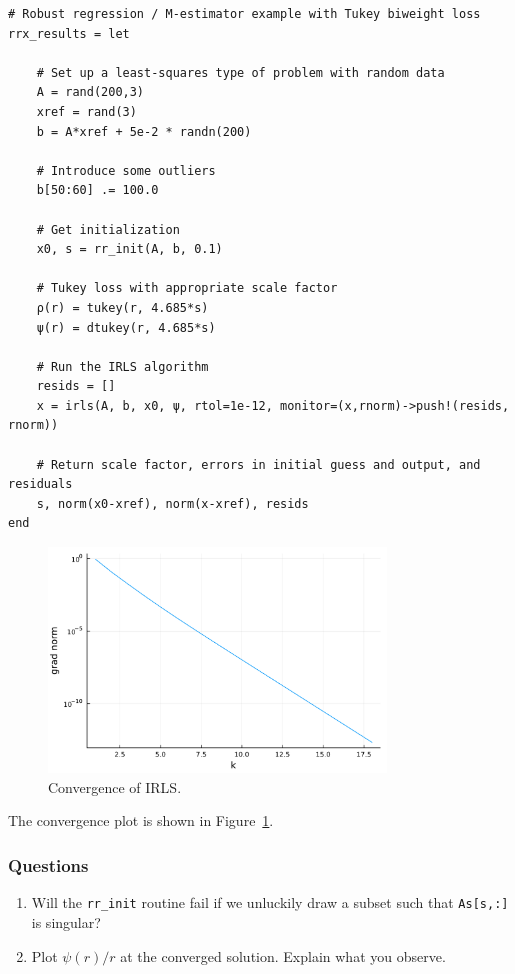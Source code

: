\documentclass[12pt, leqno]{article} %
\providecommand{\tightlist}{%
  \setlength{\itemsep}{0pt}\setlength{\parskip}{0pt}}
\begin{document}
\begin{verbatim}
# Robust regression / M-estimator example with Tukey biweight loss
rrx_results = let

    # Set up a least-squares type of problem with random data
    A = rand(200,3)
    xref = rand(3)
    b = A*xref + 5e-2 * randn(200)
    
    # Introduce some outliers
    b[50:60] .= 100.0
    
    # Get initialization
    x0, s = rr_init(A, b, 0.1)
    
    # Tukey loss with appropriate scale factor
    ρ(r) = tukey(r, 4.685*s)
    ψ(r) = dtukey(r, 4.685*s)
    
    # Run the IRLS algorithm
    resids = []
    x = irls(A, b, x0, ψ, rtol=1e-12, monitor=(x,rnorm)->push!(resids, rnorm))
    
    # Return scale factor, errors in initial guess and output, and residuals
    s, norm(x0-xref), norm(x-xref), resids
end
\end{verbatim}

\begin{figure}
\begin{center}
  \includegraphics[width=0.8\textwidth]{fig/2023-04-10-rrx-cvg.pdf}
\end{center}
\caption{Convergence of IRLS.}
\label{fig:rrx-cvg}
\end{figure}


The convergence plot is shown in Figure~\ref{fig:rrx-cvg}.

\subsubsection{Questions}

\begin{enumerate}
\def\labelenumi{\arabic{enumi}.}
\tightlist
\item
  Will the \texttt{rr\_init} routine fail if we unluckily draw a subset
  such that \texttt{As{[}s,:{]}} is singular?
\item
  Plot \(\psi(r)/r\) at the converged solution. Explain what you
  observe.
\end{enumerate}
\end{document}
